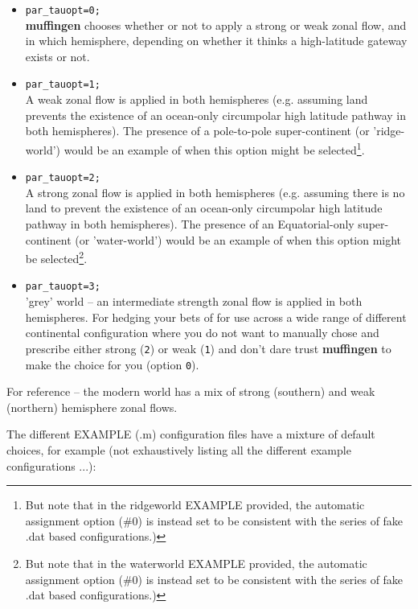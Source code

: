 \documentclass[11pt,fleqn]{book} %
\begin{document}
\vspace{1mm}
\begin{itemize}
\item \texttt{par\_tauopt=0;}
\\\textbf{muffingen} chooses whether or not to apply a strong or weak zonal flow, and in which hemisphere, depending on whether it thinks a high-latitude gateway exists or not.
\item \texttt{par\_tauopt=1;}
\\A weak zonal flow is applied in both hemispheres (e.g. assuming land prevents the existence of an ocean-only circumpolar high latitude pathway  in both hemispheres).
The presence of a pole-to-pole super-continent (or 'ridge-world') would be an example of when this option might be selected\footnote{But note that in the ridgeworld EXAMPLE provided, the automatic assignment option (\#0) is instead set to be consistent with the series of fake .dat based configurations.)}.
\item \texttt{par\_tauopt=2;}
\\A strong zonal flow is applied in both hemispheres (e.g. assuming there is no land to prevent the existence of an ocean-only circumpolar high latitude pathway  in both hemispheres). The presence of an Equatorial-only super-continent (or 'water-world') would be an example of when this option might be selected\footnote{But note that in the waterworld EXAMPLE provided, the automatic assignment option (\#0) is instead set to be consistent with the series of fake .dat based configurations.)}.
\item \texttt{par\_tauopt=3;}
\\'grey' world -- an intermediate strength zonal flow is applied in both hemispheres. For hedging your bets of for use across a wide range of different continental configuration where you do not want to manually chose and prescribe either strong (\texttt{2}) or weak (\texttt{1}) and don't dare trust \textbf{muffingen} to make the choice for you (option \texttt{0}).
\end{itemize}
\vspace{1mm}

For reference -- the modern world has a mix of strong (southern) and weak (northern) hemisphere zonal flows.

The different \textsf{\footnotesize EXAMPLE} (\textsf{\footnotesize .m}) configuration files have a mixture of default choices, for example (not exhaustively listing all the different example configurations ...):
\end{document}
